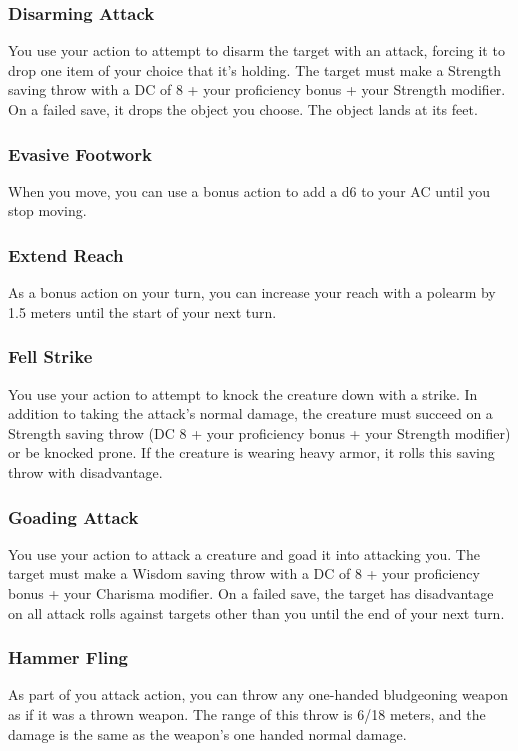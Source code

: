 \subsubsection{Disarming Attack} \label{tec::disarmingattack}
You use your action to attempt to disarm the target with an attack, forcing it to drop one item of your choice that it's holding.
The target must make a Strength saving throw with a DC of 8 + your proficiency bonus + your Strength modifier.
On a failed save, it drops the object you choose.
The object lands at its feet.

\subsubsection{Evasive Footwork} \label{tec::evasivefootwork}
When you move, you can use a bonus action to add a d6 to your AC until you stop moving.

\subsubsection{Extend Reach} \label{tec::extendreach}
As a bonus action on your turn, you can increase your reach with a polearm by 1.5 meters until the start of your next turn.

\subsubsection{Fell Strike} \label{tec::fellstrike}
You use your action to attempt to knock the creature down with a strike.
In addition to taking the attack's normal damage, the creature must succeed on a Strength saving throw (DC 8 + your proficiency bonus + your Strength modifier) or be knocked prone.
If the creature is wearing heavy armor, it rolls this saving throw with disadvantage.

\subsubsection{Goading Attack} \label{tec::goadingattack}
You use your action to attack a creature and goad it into attacking you.
The target must make a Wisdom saving throw with a DC of 8 + your proficiency bonus + your Charisma modifier.
On a failed save, the target has disadvantage on all attack rolls against targets other than you until the end of your next turn.

\subsubsection{Hammer Fling} \label{tec::hammerfling}
As part of you attack action, you can throw any one-handed bludgeoning weapon as if it was a thrown weapon.
The range of this throw is 6/18 meters, and the damage is the same as the weapon's one handed normal damage.

